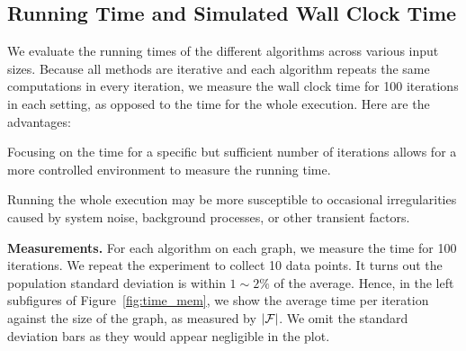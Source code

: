 

\subsection{Running Time and Simulated Wall Clock Time}


We evaluate the running times of the different algorithms across various input sizes.
Because all methods are iterative and each algorithm repeats the same computations
in every iteration, we measure the wall clock time for 100 iterations in each setting,
as opposed to the time for the whole execution.  Here are the advantages:

\begin{compactitem}
\item Focusing on the time for a specific but sufficient number of iterations allows for a more controlled environment to measure the running time.

\item Running the whole execution may be more susceptible to occasional irregularities caused by system noise, background processes, or other transient factors.
\end{compactitem}


\noindent \textbf{Measurements.}  For each algorithm on each graph,
we measure the time for 100 iterations.  We repeat the experiment to collect 10 data points.
It turns out the population standard deviation is within $1 \sim 2 \%$ of the average.
Hence, in the left subfigures of Figure~\ref{fig:time_mem}, we show
the average time per iteration against the size of the graph, as measured by $|\mathcal {F}|$.
We omit the standard deviation bars as they would appear negligible in the plot.

